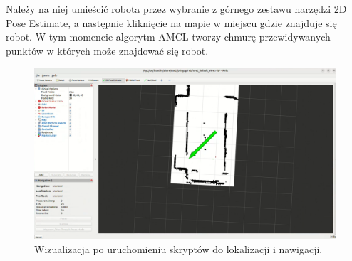 \documentclass[a4paper,twoside,12pt]{book}
\begin{document}
\newpage
Należy na niej umieścić robota przez wybranie z górnego zestawu narzędzi 2D Pose Estimate, a następnie kliknięcie na mapie w miejscu gdzie znajduje się robot. W tym momencie algorytm AMCL tworzy chmurę przewidywanych punktów w których może znajdować się robot.
\begin{figure}[!hb]
	\centering
	\includegraphics[width=1\textwidth]{images/launch-nav.png}
	\caption{Wizualizacja po uruchomieniu skryptów do lokalizacji i nawigacji.}
	\label{fig:nav-map}
\end{figure}
\end{document}
